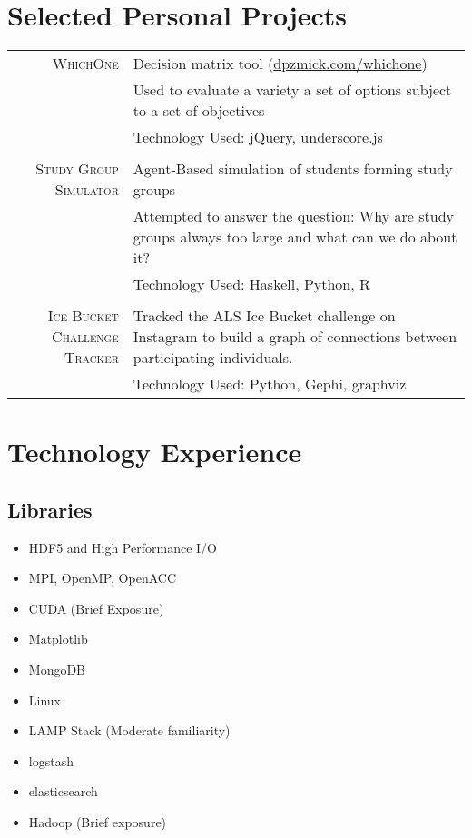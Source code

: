 \documentclass[letterpaper,10pt]{article}
\begin{document}
\section{Selected Personal Projects}
\begin{tabular}{rp{11cm}}
    \textsc{WhichOne}
    & Decision matrix tool (\href{http://dpzmick.com/whichone}{dpzmick.com/whichone})\\
    & Used to evaluate a variety a set of options subject to a set of objectives\\
    & Technology Used: jQuery, underscore.js
    \\\multicolumn{2}{c}{}\\

    \textsc{Study Group Simulator}
    & Agent-Based simulation of students forming study groups\\
    & Attempted to answer the question: Why are study groups always too large and what can we do about it?\\
    & Technology Used: Haskell, Python, R
    \\\multicolumn{2}{c}{}\\

    \textsc{Ice Bucket Challenge Tracker}
    & Tracked the ALS Ice Bucket challenge on Instagram to build a graph of connections between participating individuals.\\
    & Technology Used: Python, Gephi, graphviz\\
\end{tabular}

\section{Technology Experience}
\subsection{Libraries}
\begin{itemize}
    \item HDF5 and High Performance I/O
    \item MPI, OpenMP, OpenACC
    \item CUDA (Brief Exposure)
    \item Matplotlib
    \item MongoDB
    \item Linux
    \item LAMP Stack (Moderate familiarity)
    \item logstash
    \item elasticsearch
    \item Hadoop (Brief exposure)
\end{itemize}
\end{document}
